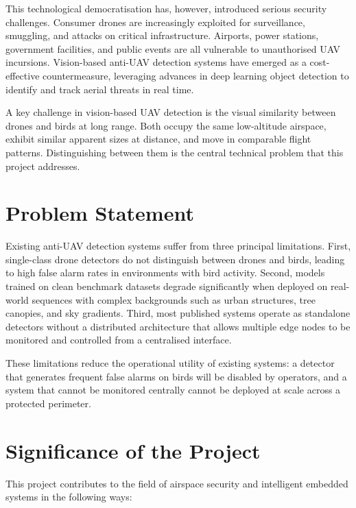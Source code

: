 \documentclass[12pt,a4paper]{report}
\begin{document}
This technological democratisation has, however, introduced serious security
challenges. Consumer drones are increasingly exploited for surveillance,
smuggling, and attacks on critical infrastructure. Airports, power stations,
government facilities, and public events are all vulnerable to unauthorised
UAV incursions. Vision-based anti-UAV detection systems have emerged as a
cost-effective countermeasure, leveraging advances in deep learning object
detection to identify and track aerial threats in real time.

A key challenge in vision-based UAV detection is the visual similarity
between drones and birds at long range. Both occupy the same low-altitude
airspace, exhibit similar apparent sizes at distance, and move in comparable
flight patterns. Distinguishing between them is the central technical problem
that this project addresses.

\section{Problem Statement}

Existing anti-UAV detection systems suffer from three principal limitations.
First, single-class drone detectors do not distinguish between drones and
birds, leading to high false alarm rates in environments with bird activity.
Second, models trained on clean benchmark datasets degrade significantly
when deployed on real-world sequences with complex backgrounds such as
urban structures, tree canopies, and sky gradients. Third, most published
systems operate as standalone detectors without a distributed architecture
that allows multiple edge nodes to be monitored and controlled from a
centralised interface.

These limitations reduce the operational utility of existing systems:
a detector that generates frequent false alarms on birds will be disabled
by operators, and a system that cannot be monitored centrally cannot be
deployed at scale across a protected perimeter.

\section{Significance of the Project}

This project contributes to the field of airspace security and intelligent
embedded systems in the following ways:
\end{document}
